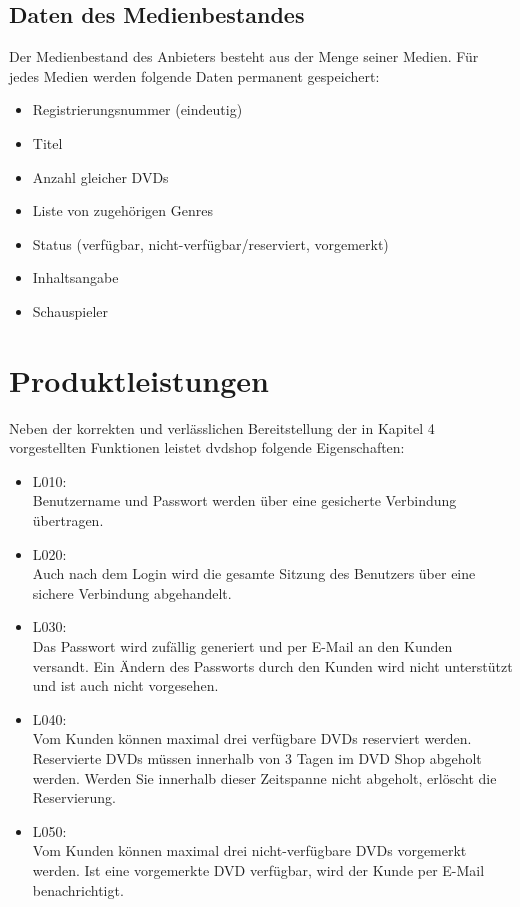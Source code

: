 \documentclass[12pt,oneside,a4paper,bibtotoc,liststotoc,pointlessnumbers]{scrartcl}
\begin{document}
\subsection{Daten des Medienbestandes}
Der Medienbestand des Anbieters besteht aus der Menge seiner Medien. Für jedes Medien werden folgende Daten permanent gespeichert:
\begin{itemize}
\item Registrierungsnummer (eindeutig)
\item Titel
\item Anzahl gleicher DVDs
\item Liste von zugehörigen Genres
\item Status (verfügbar, nicht-verfügbar/reserviert, vorgemerkt)
\item Inhaltsangabe
\item Schauspieler
\end{itemize}

\newpage
\section{Produktleistungen}
Neben der korrekten und verlässlichen Bereitstellung der in Kapitel 4 vorgestellten Funktionen leistet dvdshop folgende Eigenschaften:
\begin{itemize}
\item L010: \\Benutzername und Passwort werden über eine gesicherte Verbindung übertragen.
\item L020: \\Auch nach dem Login wird die gesamte Sitzung des Benutzers über eine sichere Verbindung abgehandelt.
\item L030: \\Das Passwort wird zufällig generiert und per E-Mail an den Kunden versandt. Ein Ändern des Passworts durch den Kunden wird nicht unterstützt und ist auch nicht vorgesehen.
\item L040: \\Vom Kunden können maximal drei verfügbare DVDs reserviert werden. Reservierte DVDs
müssen innerhalb von 3 Tagen im DVD Shop abgeholt werden. Werden Sie innerhalb dieser Zeitspanne nicht abgeholt, erlöscht die Reservierung.
\item L050: \\Vom Kunden können maximal drei nicht-verfügbare DVDs vorgemerkt werden. Ist eine
vorgemerkte DVD verfügbar, wird der Kunde per E-Mail benachrichtigt.
\end{itemize}
\end{document}
